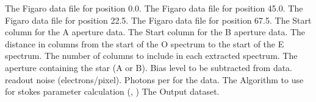 \begin{manroutinedescription}
\begin{manparametertable}
     The Figaro data file for %
position 0.0.
     The Figaro data file for %
position 45.0.
     The Figaro data file for %
position 22.5.
     The Figaro data file for %
position 67.5.
  The Start column for the A %
aperture data.
  The Start column for the B %
aperture data.
  The distance in columns from %
the start of the O
                               spectrum to the start of the E spectrum.
  The number of columns to %
include in each
                               extracted spectrum.
     The aperture containing the %
star (A or B).
     Bias level to be subtracted %
from data.
     {} readout %
noise (electrons/pixel).
     Photons per {} %
for the {} data.
     The Algorithm to use for %
stokes
                               parameter calculation ({}, {})
  The %
Output dataset.

\end{manparametertable}
\end{manroutinedescription}
